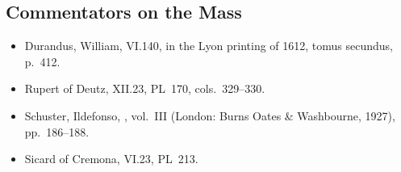 {\subsection*{Commentators on the Mass}
\begin{itemize}[leftmargin=1.2em,itemsep=.25em]
\item Durandus, William,  VI.140, in the
Lyon printing of 1612, tomus secundus, p.~412.
\item Rupert of Deutz,  XII.23, PL~170,
cols.~329--330.
\item Schuster, Ildefonso, ,
vol.~III (London: Burns Oates \& Washbourne, 1927), pp.~186--188.
\item Sicard of Cremona,  VI.23, PL~213.
\end{itemize}
\par}
